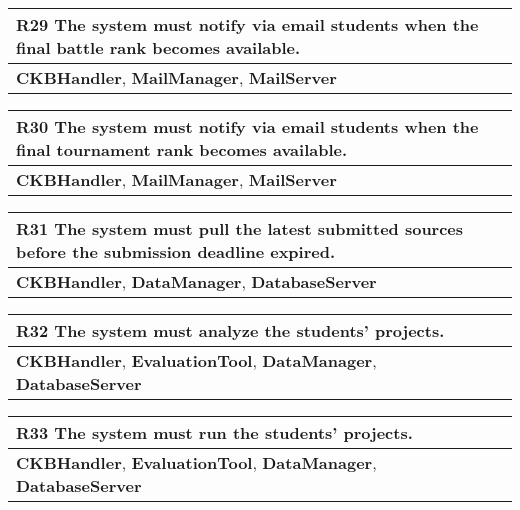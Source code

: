 \begin{table}[H]
    \begin{tabularx}{\textwidth}{X}
        \toprule
        \textbf{R29} The system must notify via email students when the final battle rank becomes available. \\ \midrule
        \textbf{CKBHandler}, \textbf{MailManager}, \textbf{MailServer} \\    
    \end{tabularx}
\end{table}

\begin{table}[H]
    \begin{tabularx}{\textwidth}{X}
        \toprule
        \textbf{R30} The system must notify via email students when the final tournament rank becomes available. \\ \midrule
        \textbf{CKBHandler}, \textbf{MailManager}, \textbf{MailServer} \\    
    \end{tabularx}
\end{table}

\begin{table}[H]
    \begin{tabularx}{\textwidth}{X}
        \toprule
        \textbf{R31} The system must pull the latest submitted sources before the submission deadline expired. \\ \midrule
        \textbf{CKBHandler}, \textbf{DataManager}, \textbf{DatabaseServer}                    \\
    \end{tabularx}
\end{table}

\begin{table}[H]
    \begin{tabularx}{\textwidth}{X}
        \toprule
        \textbf{R32} The system must analyze the students' projects. \\ \midrule
        \textbf{CKBHandler}, \textbf{EvaluationTool}, \textbf{DataManager}, \textbf{DatabaseServer}   \\
    \end{tabularx}
\end{table}

\begin{table}[H]
    \begin{tabularx}{\textwidth}{X}
        \toprule
        \textbf{R33} The system must run the students' projects. \\ \midrule
        \textbf{CKBHandler}, \textbf{EvaluationTool}, \textbf{DataManager}, \textbf{DatabaseServer}                      \\  
    \end{tabularx}
\end{table}

